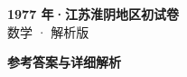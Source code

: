 \documentclass[zihao=-4, a4paper]{ctexart}
\begin{document}
\begin{center}
  {\Large\bfseries 1977 年·江苏淮阴地区初试卷}\\[4pt]
  {\large 数学 · 解析版}
\end{center}
\medskip
{}

\clearpage
{}
\begin{center}{\Large\bfseries 参考答案与详细解析}\end{center}
\medskip

\end{document}
